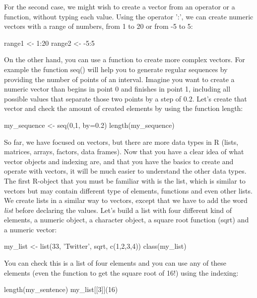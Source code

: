 For the second case, we might wish to create a vector from an operator or a function, without typing each value. Using the operator ':', we can create numeric vectors with a range of numbers, from 1 to 20 or from -5 to 5:	

\begin{exampler}
range1 <- 1:20
range2 <- -5:5
\end{exampler}

On the other hand, you can use a function to create more complex vectors. For example the function seq() will help you to generate regular sequences by providing the number of points of an interval.  Imagine you want to create a numeric vector than begins in point 0 and finishes in point 1, including all possible values that separate those two points by a step of 0.2. Let's create that vector and check the amount of created elements by using the function length:

\begin{exampler}
my_sequence <- seq(0,1, by=0.2)
length(my_sequence)
\end{exampler}

So far, we have focused on vectors, but there are more data types in R (lists, matrices, arrays, factors, data frames). Now that you have a clear idea of what vector objects and indexing are, and that you have the basics to create and operate with vectors, it will be much easier to understand the other data types. The first R-object that you must be familiar with is the list, which is similar to vectors but may contain different type of elements, functions and even other lists. We create lists in a similar way to vectors, except that we have to add the word \emph{list} before declaring the values. Let's build a list with four different kind of elements, a numeric object, a character object, a square root function (sqrt) and a numeric vector:

\begin{exampler}
my_list <- list(33, 'Twitter', sqrt, c(1,2,3,4))
class(my_list)
\end{exampler}

You can check this is a list of four elements and you can use any of these elements (even the function to get the square root of 16!) using the indexing:

\begin{exampler}
length(my_sentence)
my_list[[3]](16)
\end{exampler}






